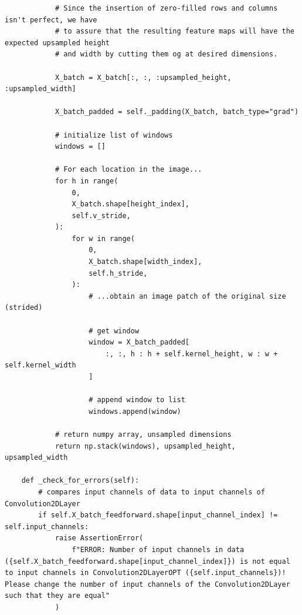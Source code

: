 \documentclass[%
oneside,                 %
final,                   %
10pt]{article}
\begin{document}
\begin{verbatim}
            # Since the insertion of zero-filled rows and columns isn't perfect, we have
            # to assure that the resulting feature maps will have the expected upsampled height
            # and width by cutting them og at desired dimensions.

            X_batch = X_batch[:, :, :upsampled_height, :upsampled_width]

            X_batch_padded = self._padding(X_batch, batch_type="grad")

            # initialize list of windows
            windows = []

            # For each location in the image...
            for h in range(
                0,
                X_batch.shape[height_index],
                self.v_stride,
            ):
                for w in range(
                    0,
                    X_batch.shape[width_index],
                    self.h_stride,
                ):
                    # ...obtain an image patch of the original size (strided)

                    # get window
                    window = X_batch_padded[
                        :, :, h : h + self.kernel_height, w : w + self.kernel_width
                    ]

                    # append window to list
                    windows.append(window)

            # return numpy array, unsampled dimensions
            return np.stack(windows), upsampled_height, upsampled_width

    def _check_for_errors(self):
        # compares input channels of data to input channels of Convolution2DLayer
        if self.X_batch_feedforward.shape[input_channel_index] != self.input_channels:
            raise AssertionError(
                f"ERROR: Number of input channels in data ({self.X_batch_feedforward.shape[input_channel_index]}) is not equal to input channels in Convolution2DLayerOPT ({self.input_channels})! Please change the number of input channels of the Convolution2DLayer such that they are equal"
            )

\end{verbatim}
\end{document}
